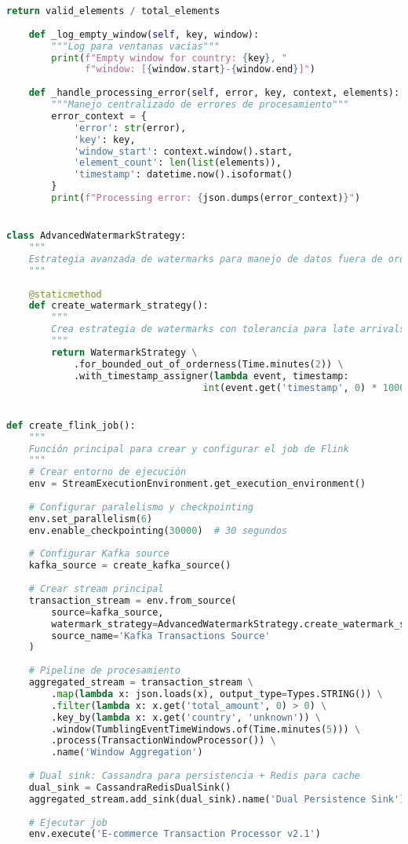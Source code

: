 \begin{lstlisting}[language=python, caption=Implementación de Procesamiento por Ventanas en PyFlink, label=lst:flink_windowing]
        return valid_elements / total_elements
    
    def _log_empty_window(self, key, window):
        """Log para ventanas vacías"""
        print(f"Empty window for country: {key}, "
              f"window: [{window.start}-{window.end}]")
    
    def _handle_processing_error(self, error, key, context, elements):
        """Manejo centralizado de errores de procesamiento"""
        error_context = {
            'error': str(error),
            'key': key,
            'window_start': context.window().start,
            'element_count': len(list(elements)),
            'timestamp': datetime.now().isoformat()
        }
        print(f"Processing error: {json.dumps(error_context)}")


class AdvancedWatermarkStrategy:
    """
    Estrategia avanzada de watermarks para manejo de datos fuera de orden
    """
    
    @staticmethod
    def create_watermark_strategy():
        """
        Crea estrategia de watermarks con tolerancia para late arrivals
        """
        return WatermarkStrategy \
            .for_bounded_out_of_orderness(Time.minutes(2)) \
            .with_timestamp_assigner(lambda event, timestamp: 
                                   int(event.get('timestamp', 0) * 1000))


def create_flink_job():
    """
    Función principal para crear y configurar el job de Flink
    """
    # Crear entorno de ejecución
    env = StreamExecutionEnvironment.get_execution_environment()
    
    # Configurar paralelismo y checkpointing
    env.set_parallelism(6)
    env.enable_checkpointing(30000)  # 30 segundos
    
    # Configurar Kafka source
    kafka_source = create_kafka_source()
    
    # Crear stream principal
    transaction_stream = env.from_source(
        source=kafka_source,
        watermark_strategy=AdvancedWatermarkStrategy.create_watermark_strategy(),
        source_name='Kafka Transactions Source'
    )
    
    # Pipeline de procesamiento
    aggregated_stream = transaction_stream \
        .map(lambda x: json.loads(x), output_type=Types.STRING()) \
        .filter(lambda x: x.get('total_amount', 0) > 0) \
        .key_by(lambda x: x.get('country', 'unknown')) \
        .window(TumblingEventTimeWindows.of(Time.minutes(5))) \
        .process(TransactionWindowProcessor()) \
        .name('Window Aggregation')
    
    # Dual sink: Cassandra para persistencia + Redis para cache
    dual_sink = CassandraRedisDualSink()
    aggregated_stream.add_sink(dual_sink).name('Dual Persistence Sink')
    
    # Ejecutar job
    env.execute('E-commerce Transaction Processor v2.1')
\end{lstlisting}

